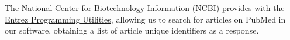 The National Center for Biotechnology Information (NCBI) provides with the
\href{http://www.ncbi.nlm.nih.gov/books/NBK25501/}{Entrez Programming Utilities},
allowing us to search for articles on PubMed in our software, obtaining a list of article
unique identifiers as a response.
